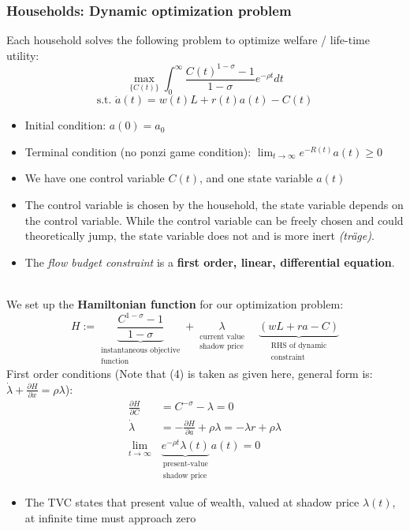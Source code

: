 \subsubsection{Households: Dynamic optimization problem}
Each household solves the following problem to optimize welfare / life-time utility: 
\[
\max_{\{C(t)\}} \int_{0}^{\infty} \frac{C(t)^{1-\sigma} - 1}{1 - \sigma} e^{-\rho t} dt
\]
\[
\text{s.t. } \dot{a}(t) = w(t)L + r(t)a(t) - C(t)
\]
\begin{itemize}
    \item Initial condition: $a(0) = a_0$
    \item Terminal condition (no ponzi game condition): $\lim_{t \to \infty} e^{-R(t)} a(t) \geq 0$
    \item We have one control variable $C(t)$, and one state variable $a(t)$
    \item The control variable is chosen by the household, the state variable depends on the control variable. While the control variable can be freely chosen and could theoretically jump, the state variable does not and is more inert \textit{(träge)}.
    \item The \textit{flow budget constraint} is a \textbf{first order, linear, differential equation}. 
\end{itemize}
\\
We set up the \textbf{Hamiltonian function} for our optimization problem:
$$H := \underbrace{\frac{C^{1-\sigma} - 1}{1 - \sigma}}_{\substack{\text{instantaneous objective} \\ \text{function}}} + \underset{\substack{\text{current value} \\ \text{shadow price}}}{\lambda} \quad \underbrace{(wL + ra - C)}_{\substack{\text{RHS of dynamic} \\ \text{constraint}}}$$
First order conditions (Note that (4) is taken as given here, general form is: $\dot{\lambda}+\frac{\partial H}{\partial x}=\rho \lambda$): 
\begin{align}
    \frac{\partial H}{\partial C} &= C^{-\sigma} - \lambda = 0 \tag{3} \\[10pt]
    \dot{\lambda} &= -\frac{\partial H}{\partial a} + \rho \lambda = -\lambda r + \rho \lambda \tag{4} \\[10pt]
    \lim_{t \to \infty} &\underbrace{e^{-\rho t} \lambda(t)}_{\substack{\text{present-value} \\ \text{shadow price}}} a(t) = 0 \tag{TVC}
\end{align}
\begin{itemize}
    \item The TVC states that present value of wealth, valued at shadow price $\lambda(t)$, at infinite time must approach zero
\end{itemize}
